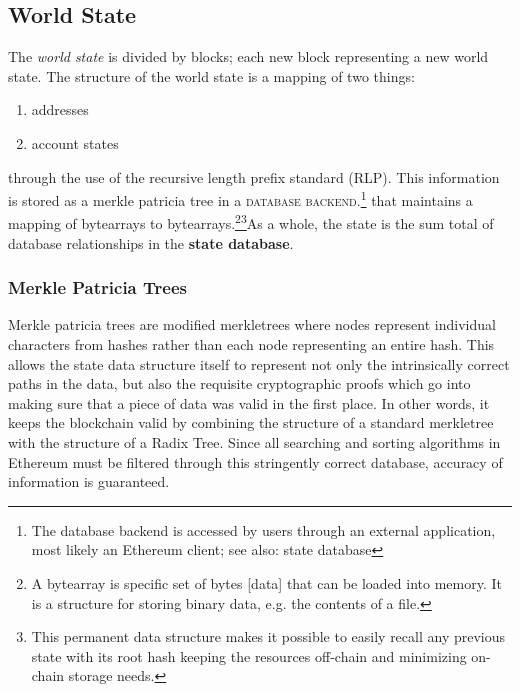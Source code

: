 \documentclass[10pt,letterpaper,leqno,bibliography=totoc]{scrartcl}
\newenvironment{alphafootnotes}
{\par\edef\savedfootnotenumber{\number\value{footnote}}
\renewcommand{\thefootnote}{\alph{footnote}}
\setcounter{footnote}{0}}
{\par\setcounter{footnote}{\savedfootnotenumber}}
\begin{document}
\begin{alphafootnotes}
\begin{multicols*}{2}
			\subsection{World State}
				The \textit{world state} is divided by blocks; each new block representing a new world state. The structure of the world state is a mapping of two things:
				\begin{enumerate}
					\item addresses  
					\item account states
				\end{enumerate}
				through the use of the recursive length prefix standard (RLP). This information is stored as a merkle patricia tree in a \textsc{database backend}.\footnote{The database backend is accessed by users through an external application, most likely an Ethereum client; see also: \gls{state database}} that maintains a mapping of bytearrays to bytearrays.\footnote{A bytearray is specific set of bytes [data] that can be loaded into memory. It is a structure for storing binary data, e.g. the contents of a file.}\footnote{This permanent data structure makes it possible to easily recall any previous state with its root hash keeping the resources off-chain and minimizing on-chain storage needs.}As a whole, the state is the sum total of database relationships in the \textbf{ \gls{state database}}. 
			
			\subsubsection{Merkle Patricia Trees} 
	
				
	Merkle patricia trees are modified merkletrees where nodes represent individual characters from hashes rather than each node representing an entire hash. This allows the state data structure itself to represent not only the intrinsically correct paths in the data, but also the requisite cryptographic proofs which go into making sure that a piece of data was valid in the first place. In other words, it keeps the blockchain valid by combining the structure of a standard merkletree with the structure of a Radix Tree. Since all searching and sorting algorithms in Ethereum must be filtered through this stringently correct database, accuracy of information is guaranteed. \par		
		

\end{multicols*}
\end{alphafootnotes}
\end{document}
